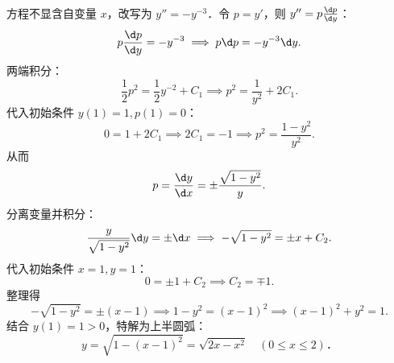 \begin{solution}

    方程不显含自变量 $x$，改写为 $y'' = -y^{-3}$．令 $p = y'$，则 $y'' = p \frac{\d p}{\d y}$：
    \begin{equation}
        p \frac{\d p}{\d y} = -y^{-3} \implies p \d p = -y^{-3}\d y.
    \end{equation}
    两端积分：
    \begin{equation}
        \frac{1}{2}p^2 = \frac{1}{2}y^{-2} + C_1 \implies p^2 = \frac{1}{y^2} + 2C_1.
    \end{equation}
    代入初始条件 $y(1) = 1, p(1) = 0$：
    \begin{equation}
        0 = 1 + 2C_1 \implies 2C_1 = -1 \implies p^2 = \frac{1 - y^2}{y^2}.
    \end{equation}
    从而
    \begin{equation}
        p = \frac{\d y}{\d x} = \pm \frac{\sqrt{1 - y^2}}{y}.
    \end{equation}
    分离变量并积分：
    \begin{equation}
        \frac{y}{\sqrt{1 - y^2}}\d y = \pm \d x \implies -\sqrt{1 - y^2} = \pm x + C_2.
    \end{equation}
    代入初始条件 $x = 1, y = 1$：
    \begin{equation}
        0 = \pm 1 + C_2 \implies C_2 = \mp 1.
    \end{equation}
    整理得
    \begin{equation}
        -\sqrt{1 - y^2} = \pm(x - 1) \implies 1 - y^2 = (x - 1)^2 \implies (x - 1)^2 + y^2 = 1.
    \end{equation}
    结合 $y(1) = 1 > 0$，特解为上半圆弧：
    \begin{equation}
        \boxed{y = \sqrt{1 - (x - 1)^2} = \sqrt{2x - x^2} \quad (0 \leqslant x \leqslant 2)．}
    \end{equation}
\end{solution}

\endinput
